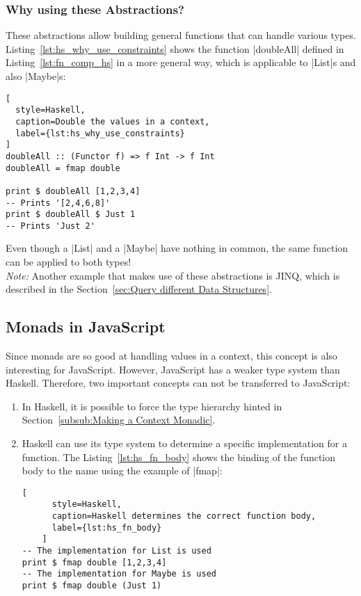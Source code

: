 \subsubsection{Why using these Abstractions?} %
\label{subsub:Why using these Abstractions?}
These abstractions allow building general functions that can handle various
types. Listing~\ref{lst:hs_why_use_constraints} shows the function |doubleAll|
defined in Listing~\ref{lst:fn_comp_hs} in a more general way, which is
applicable to |List|s and also |Maybe|s:

\begin{lstlisting}[
  style=Haskell,
  caption=Double the values in a context,
  label={lst:hs_why_use_constraints}
]
doubleAll :: (Functor f) => f Int -> f Int
doubleAll = fmap double

print $ doubleAll [1,2,3,4]
-- Prints '[2,4,6,8]'
print $ doubleAll $ Just 1
-- Prints 'Just 2'
\end{lstlisting}
Even though a |List| and a |Maybe| have nothing in common, the same function
can be applied to both types! \\ 
\textit{Note:} Another example that makes use of these abstractions is JINQ,
which is described in the Section~\ref{sec:Query different Data Structures}.

\subsection{Monads in JavaScript} %
\label{sub:Monads in JavaScript}
Since monads are so good at handling values in a context, this concept is also
interesting for JavaScript. However, JavaScript has a weaker type system than
Haskell. Therefore, two important concepts can not be transferred to
JavaScript: 
\begin{enumerate}
  \item In Haskell, it is possible to force the type hierarchy hinted in
    Section~\ref{subsub:Making a Context Monadic}.
  \item Haskell can use its type system to determine a specific implementation
    for a function. The Listing~\ref{lst:hs_fn_body} shows the binding of the
    function body to the name using the example of |fmap|:
    \begin{lstlisting}[
      style=Haskell,
      caption=Haskell determines the correct function body,
      label={lst:hs_fn_body}
    ]
-- The implementation for List is used
print $ fmap double [1,2,3,4]
-- The implementation for Maybe is used
print $ fmap double (Just 1)
    \end{lstlisting}
\end{enumerate}


